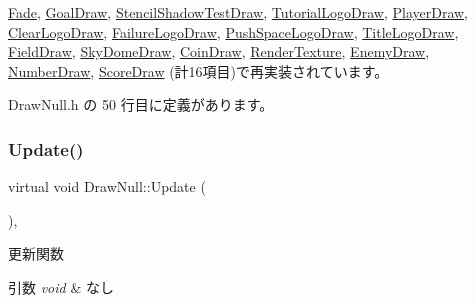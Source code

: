 \mbox{\hyperlink{class_fade_ae77d06811869d3c8162a42c3e0e14f7f}{Fade}}, \mbox{\hyperlink{class_goal_draw_a01318a0606848a3ca8ca7b7acbf4df24}{Goal\+Draw}}, \mbox{\hyperlink{class_stencil_shadow_test_draw_ad0672bf4ecfc8091cf54ed6f2c76b618}{Stencil\+Shadow\+Test\+Draw}}, \mbox{\hyperlink{class_tutorial_logo_draw_a949fb70954e3df28f87b8ed5c61bf8f1}{Tutorial\+Logo\+Draw}}, \mbox{\hyperlink{class_player_draw_a917b2947914287f23d87ca75cd68f553}{Player\+Draw}}, \mbox{\hyperlink{class_clear_logo_draw_aa73db5b701e644f8e552ddb254a0a9aa}{Clear\+Logo\+Draw}}, \mbox{\hyperlink{class_failure_logo_draw_a97646253380b54f37565650e211f33cd}{Failure\+Logo\+Draw}}, \mbox{\hyperlink{class_push_space_logo_draw_a79021c1df43968d6008de74126d53fba}{Push\+Space\+Logo\+Draw}}, \mbox{\hyperlink{class_title_logo_draw_a07bbf9e8de5c7b9ee028408496c13c50}{Title\+Logo\+Draw}}, \mbox{\hyperlink{class_field_draw_a89a78212c141714d9e39e25e663aaeff}{Field\+Draw}}, \mbox{\hyperlink{class_sky_dome_draw_aee1c6b102a97033073b2559b8c2c328b}{Sky\+Dome\+Draw}}, \mbox{\hyperlink{class_coin_draw_a6484c22a5598e298f18e7cd6083cd551}{Coin\+Draw}}, \mbox{\hyperlink{class_render_texture_a0e55cd9b412d87dfe1f4b90f29f357c8}{Render\+Texture}}, \mbox{\hyperlink{class_enemy_draw_a2861dc0623b0be7726bc69a6a469190e}{Enemy\+Draw}}, \mbox{\hyperlink{class_number_draw_a2b203d101f23f0d3f584937ff5ad662a}{Number\+Draw}}, \mbox{\hyperlink{class_score_draw_aad744f8a7a1202e6ba8117c660f297ee}{Score\+Draw}} (計16項目)で再実装されています。



 Draw\+Null.\+h の 50 行目に定義があります。

\mbox{\label{class_draw_null_a0149bcf84a34b138642ab7975ae46f30}} 
\subsubsection{\texorpdfstring{Update()}{Update()}}
{\footnotesize\ttfamily virtual void Draw\+Null\+::\+Update (\begin{DoxyParamCaption}{ }\end{DoxyParamCaption})\hspace{0.3cm}{\ttfamily [inline]}, {\ttfamily [virtual]}}



更新関数 


\begin{DoxyParams}{引数}
{\em void} & なし \\
\hline
\end{DoxyParams}

